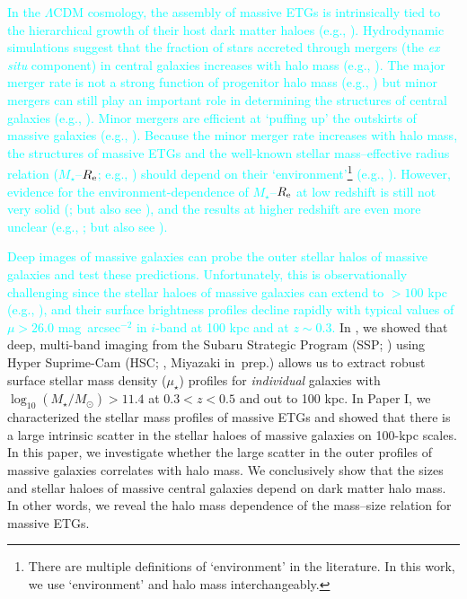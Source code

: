 \documentclass[a4paper,fleqn,usenatbib]{mnras}
\def\sb{mag~arcsec$^{-2}$}
\def\mstar{{$M_{\star}$}}
\def\logms{{$\log_{10} (M_{\star}/M_{\odot})$}}
\def\mden{{$\mu_{\star}$}}
\newcommand{\song}[1]{\textcolor{cyan}{#1}}
\begin{document}
     \song{In the $\Lambda$CDM cosmology, the assembly of massive ETGs is intrinsically 
    tied to the hierarchical growth of their host dark matter haloes 
    (e.g., \citealt{Leauthaud2012, Behroozi2013, Shankar2013}). 
    Hydrodynamic simulations suggest that the fraction of stars accreted through 
    mergers (the \textit{ex situ} component) in central galaxies increases with halo 
    mass (e.g., \citealt{RodriguezGomez2016, Pillepich2017b}). 
    The major merger rate is not a strong function of progenitor halo mass 
    (e.g., \citealt{Shankar2015}) but minor mergers can still play an important 
    role in determining the structures of central galaxies 
    (e.g., \citealt{Guo2011, Yoon2017}). 
    Minor mergers are efficient at `puffing up' the outskirts of massive 
    galaxies (e.g., \citealt{Oogi2013, Bedorf2013}). 
    Because the minor merger rate increases with halo mass, the 
    structures of massive ETGs and the well-known stellar mass--effective radius 
    relation (\mstar{}--$R_{\rm e}$; e.g., \citealt{Shen2003, Guo2009}) should 
    depend on their `environment'\footnote{There are multiple definitions of 
    `environment' in the literature. 
    In this work, we use `environment' and halo mass interchangeably.}
    (e.g., \citealt{Shankar2013, Shankar2014}). 
    However, evidence for the environment-dependence of \mstar{}--$R_{\rm e}$
    at low redshift is still not very solid (\citealt{Nair2010, HCompany13}; 
    but also see \citealt{Yoon2017}), and the results at higher redshift are 
    even more unclear (e.g., \citealt{Papovich2012, Lani2013, Delaye2014}; but 
    also see \citealt{Rettura2010}).
    }
	
	\song{
    Deep images of massive galaxies can probe the outer stellar halos of massive 
    galaxies and test these predictions. 
    Unfortunately, this is observationally challenging since the stellar haloes 
    of massive galaxies can extend to $>100$ kpc (e.g., 
    \citealt{Tal2011, DSouza2014}), and their surface brightness profiles decline 
    rapidly with typical values of $\mu > 26.0$ \sb{} in $i$-band at 100 kpc and 
    at $z\sim0.3$. 
    }
    In \citet[][Paper I hereafter]{hscMassiveI}, we showed that deep, 
    multi-band imaging from the Subaru Strategic Program (SSP; \citealt{HSC-SSP,
    HSC-DR1}) using Hyper Suprime-Cam (HSC; \citealt{Miyazaki2012}, 
    Miyazaki in~prep.) allows us to extract robust surface stellar
    mass density (\mden{}) profiles for {\it individual} galaxies with 
    \logms{}$>11.4$ at $0.3 < z < 0.5$ and out to 100 kpc. 
    In Paper I, we characterized the stellar mass profiles of massive ETGs and 
    showed that there is a large intrinsic scatter in the stellar haloes of
    massive galaxies on 100-kpc scales. 
    In this paper, we investigate whether the large scatter in the outer 
    profiles of massive galaxies correlates with halo mass. 
    We conclusively show that the sizes and stellar haloes of massive central galaxies 
    depend on dark matter halo mass. 
    In other words, we reveal the halo mass dependence of the mass--size relation 
    for massive ETGs.   
    
\end{document}
